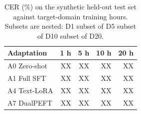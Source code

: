 \begin{table}[t]
\centering
\caption{CER (\%) on the synthetic held-out test set against target-domain training hours. Subsets are nested: D1 subset of D5 subset of D10 subset of D20.}
\label{tab:table2_data_budget}
\begin{tabular}{lrrrr}
\toprule
Adaptation & 1 h & 5 h & 10 h & 20 h \\
\midrule
A0 Zero-shot & XX & XX & XX & XX \\
A1 Full SFT & XX & XX & XX & XX \\
A4 Text-LoRA & XX & XX & XX & XX \\
A7 DualPEFT & XX & XX & XX & XX \\
\bottomrule
\end{tabular}
\end{table}
